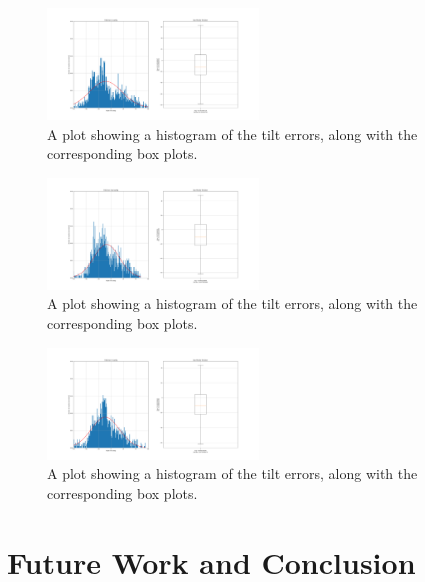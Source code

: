 \documentclass[format=sigconf, review=true, screen=true, anonymous=true]{acmart}
\begin{document}
\begin{figure}
  \centering
  \includegraphics[width=0.5\textwidth]{figures/tilt_err_lo.png}
  \caption{A plot showing a histogram of the tilt errors, along with the corresponding box plots. }
  \label{fig:tilt-err-lo}
\end{figure}

\begin{figure}
  \centering
  \includegraphics[width=0.5\textwidth]{figures/tilt_err_med.png}
  \caption{A plot showing a histogram of the tilt errors, along with the corresponding box plots. }
  \label{fig:tilt-err-med}
\end{figure}

\begin{figure}
  \centering
  \includegraphics[width=0.5\textwidth]{figures/tilt_err_hi.png}
  \caption{A plot showing a histogram of the tilt errors, along with the corresponding box plots. }
  \label{fig:tilt-err-hi}
\end{figure}

\section{Future Work and Conclusion}



\end{document}
